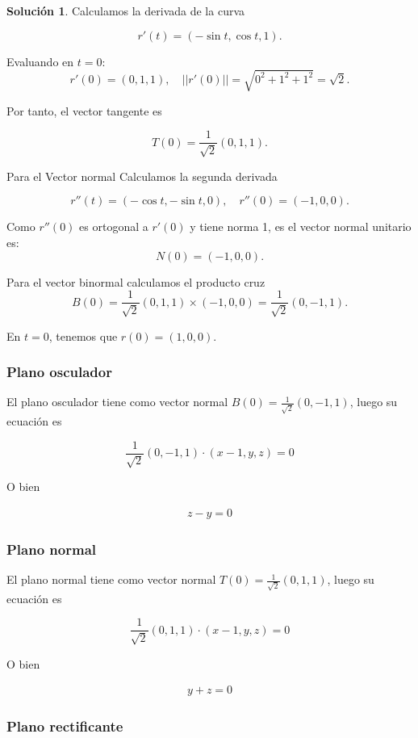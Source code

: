 \documentclass{article}
\theoremstyle{plain}
\theoremstyle{definition}
\newtheorem{sol}[thm]{Solución}
\begin{document}
\begin{sol}Calculamos la derivada de la curva
\end{sol}

\[
r'(t) = (-\sin t, \cos t, 1).
\]

Evaluando en $t = 0$:
\[
r'(0) = (0, 1, 1), \quad ||r'(0)|| = \sqrt{0^2 + 1^2 + 1^2} = \sqrt{2}.
\]

Por tanto, el vector tangente  es

\[
T(0) = \frac{1}{\sqrt{2}}(0, 1, 1).
\]

Para el Vector normal  Calculamos la segunda derivada

\[
r''(t) = (-\cos t, -\sin t, 0), \quad r''(0) = (-1, 0, 0).
\]

Como $r''(0)$ es ortogonal a $r'(0)$ y tiene norma 1, es el vector normal unitario es:
\[
N(0) = (-1, 0, 0).
\]

Para el vector binormal calculamos el producto cruz
\[
B(0) = \frac{1}{\sqrt{2}}(0,1,1) \times (-1,0,0) = \frac{1}{\sqrt{2}}(0,-1,1).
\]


En $t=0 $, tenemos que $r(0) = (1, 0, 0)$.

\subsubsection*{Plano osculador}
El plano osculador tiene como vector normal $B(0) = \frac{1}{\sqrt{2}}(0, -1, 1)$, luego su ecuaci\'on es

\[
\frac{1}{\sqrt{2}}(0, -1, 1) \cdot (x - 1, y, z) = 0
\]

O bien


\begin{align*}
    z-y =0
\end{align*}

\subsubsection*{Plano normal}
El plano normal tiene como vector normal  $T(0) = \frac{1}{\sqrt{2}}(0, 1, 1)$, luego su ecuaci\'on es

\[
\frac{1}{\sqrt{2}}(0,1,1) \cdot (x - 1, y, z) = 0
\]

O bien

\begin{align*}
    y+z =0
\end{align*}

\subsubsection*{Plano rectificante}
\end{document}
